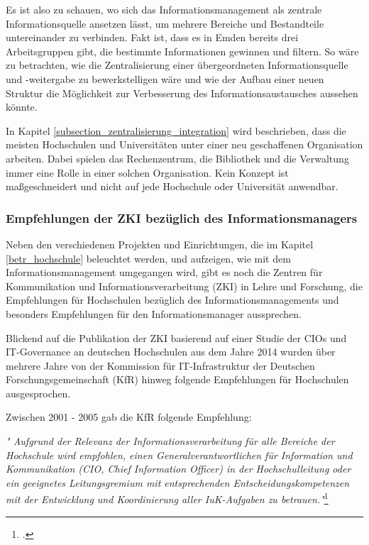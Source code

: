 Es ist also zu schauen, wo sich das Informationsmanagement als zentrale Informationsquelle ansetzen lässt, um mehrere Bereiche und Bestandteile untereinander zu verbinden. Fakt ist, dass es in Emden bereits drei Arbeitsgruppen gibt, die bestimmte Informationen gewinnen und filtern.  So wäre zu betrachten, wie die Zentralisierung einer übergeordneten Informationsquelle und -weitergabe zu bewerkstelligen wäre und wie der Aufbau einer neuen Struktur die Möglichkeit zur Verbesserung des Informationsaustausches aussehen könnte. 

In Kapitel \ref{subsection_zentralisierung_integration} wird beschrieben, dass die meisten Hochschulen und Universitäten unter einer neu geschaffenen Organisation arbeiten. Dabei spielen das Rechenzentrum, die Bibliothek und die Verwaltung immer eine Rolle in einer solchen Organisation. Kein Konzept ist maßgeschneidert und nicht auf jede Hochschule oder Universität anwendbar.

\subsubsection{Empfehlungen der ZKI bezüglich des Informationsmanagers}
\label{subsubsection_zki}

Neben den verschiedenen Projekten und Einrichtungen, die im Kapitel \ref{betr_hochschule} beleuchtet werden, und aufzeigen, wie mit dem Informationsmanagement umgegangen wird, gibt es noch die Zentren für Kommunikation und Informationsverarbeitung (ZKI) in Lehre und Forschung, die Empfehlungen für Hochschulen bezüglich des Informationsmanagements und besonders Empfehlungen für den Informationsmanager aussprechen.

Blickend auf die Publikation der ZKI basierend auf einer Studie der CIOs und IT-Governance an deutschen Hochschulen aus dem Jahre 2014 wurden über mehrere Jahre von der Kommission für IT-Infrastruktur der Deutschen Forschungsgemeinschaft (KfR) hinweg folgende Empfehlungen für Hochschulen ausgesprochen.

Zwischen 2001 - 2005 gab die KfR folgende Empfehlung:

\textit{" Aufgrund der Relevanz der Informationsverarbeitung für alle Bereiche der  Hochschule wird empfohlen, 
	einen Generalverantwortlichen für Information und  Kommunikation (CIO, Chief Information Officer) 
	in der Hochschulleitung oder ein geeignetes Leitungsgremium mit entsprechenden 
	Entscheidungskompetenzen mit der Entwicklung und  Koordinierung aller IuK-Aufgaben 
	zu betrauen."}\footcite[3]{zki_studie_cio_2014}

